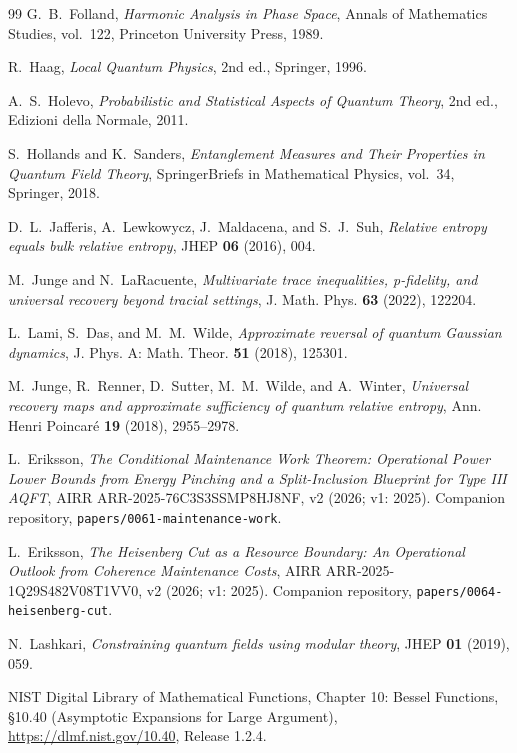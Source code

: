 \documentclass[11pt,a4paper]{article}
\theoremstyle{plain}
\theoremstyle{definition}
\theoremstyle{remark}
\begin{document}
\begin{thebibliography}{99}
 G.~B.~Folland, \emph{Harmonic Analysis in Phase Space}, Annals
of Mathematics Studies, vol.~122, Princeton University Press, 1989.

 R.~Haag, \emph{Local Quantum Physics}, 2nd ed., Springer, 1996.

 A.~S.~Holevo, \emph{Probabilistic and Statistical Aspects of
Quantum Theory}, 2nd ed., Edizioni della Normale, 2011.

 S.~Hollands and K.~Sanders, \emph{Entanglement Measures
and Their Properties in Quantum Field Theory}, SpringerBriefs in Mathematical
Physics, vol.~34, Springer, 2018.

 D.~L.~Jafferis, A.~Lewkowycz, J.~Maldacena, and S.~J.~Suh,
\emph{Relative entropy equals bulk relative entropy}, JHEP \textbf{06} (2016), 004.

 M.~Junge and N.~LaRacuente, \emph{Multivariate trace
inequalities, p-fidelity, and universal recovery beyond tracial settings}, J. Math.
Phys. \textbf{63} (2022), 122204.

 L.~Lami, S.~Das, and M.~M.~Wilde, \emph{Approximate
reversal of quantum Gaussian dynamics}, J. Phys. A: Math. Theor. \textbf{51}
(2018), 125301.

 M.~Junge, R.~Renner, D.~Sutter, M.~M.~Wilde, and A.~Winter,
\emph{Universal recovery maps and approximate sufficiency of quantum relative
entropy}, Ann. Henri Poincar\'e \textbf{19} (2018), 2955--2978.

 L.~Eriksson, \emph{The Conditional Maintenance Work Theorem:
Operational Power Lower Bounds from Energy Pinching and a Split-Inclusion
Blueprint for Type III AQFT}, AIRR ARR-2025-76C3S3SSMP8HJ8NF, v2 (2026; v1: 2025).
Companion repository, \texttt{papers/0061-maintenance-work}.

 L.~Eriksson, \emph{The Heisenberg Cut as a Resource Boundary: An
Operational Outlook from Coherence Maintenance Costs}, AIRR ARR-2025-1Q29S482V08T1VV0, v2
(2026; v1: 2025). Companion repository, \texttt{papers/0064-heisenberg-cut}.

 N.~Lashkari, \emph{Constraining quantum fields using modular
theory}, JHEP \textbf{01} (2019), 059.

 NIST Digital Library of Mathematical Functions, Chapter 10: Bessel
Functions, \S10.40 (Asymptotic Expansions for Large Argument),
\url{https://dlmf.nist.gov/10.40}, Release 1.2.4.


\end{thebibliography}
\end{document}
